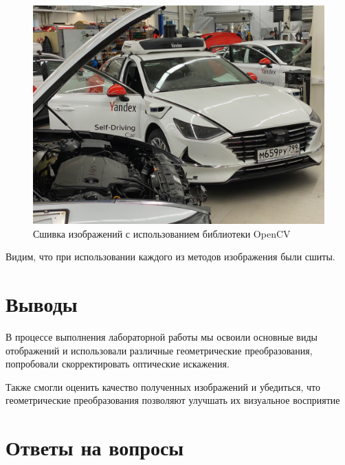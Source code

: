 \begin{figure}[ht]
    \includegraphics[width=\textwidth]{../outputs/image_stitch.png}
    \caption{Сшивка изображений с использованием библиотеки OpenCV}
    \label{fig:stitched_images_cv}
\end{figure}

Видим, что при использовании каждого из методов изображения были сшиты.

\section{Выводы}
В процессе выполнения лабораторной работы мы освоили основные виды отображений и использовали различные геометрические преобразования, попробовали скорректировать оптические искажения. 

Также смогли оценить качество полученных изображений и убедиться, что геометрические преобразования позволяют улучшать их визуальное восприятие

\section{Ответы на вопросы}

\setcounter{question}{0}

\newcommand{\question}[1]{\item[Q\refstepcounter{question}\thequestion.] #1}
\newcommand{\answer}[1]{\item[A\thequestion.] #1}

